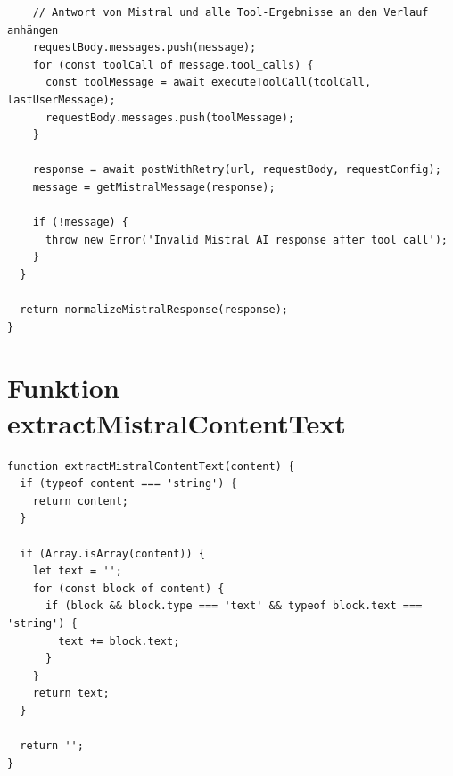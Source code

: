 \begin{lstlisting}
    // Antwort von Mistral und alle Tool-Ergebnisse an den Verlauf anhängen
    requestBody.messages.push(message);
    for (const toolCall of message.tool_calls) {
      const toolMessage = await executeToolCall(toolCall, lastUserMessage);
      requestBody.messages.push(toolMessage);
    }

    response = await postWithRetry(url, requestBody, requestConfig);
    message = getMistralMessage(response);

    if (!message) {
      throw new Error('Invalid Mistral AI response after tool call');
    }
  }

  return normalizeMistralResponse(response);
}
\end{lstlisting}

\section{Funktion extractMistralContentText}

\begin{lstlisting}
function extractMistralContentText(content) {
  if (typeof content === 'string') {
    return content;
  }

  if (Array.isArray(content)) {
    let text = '';
    for (const block of content) {
      if (block && block.type === 'text' && typeof block.text === 'string') {
        text += block.text;
      }
    }
    return text;
  }

  return '';
}
\end{lstlisting}

